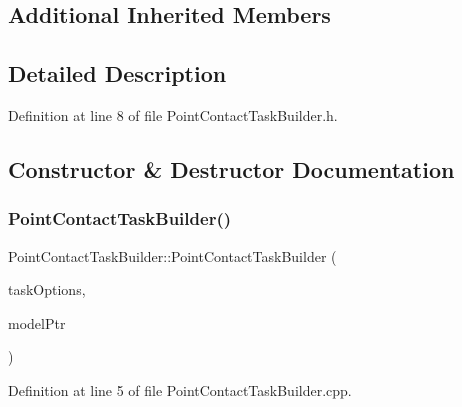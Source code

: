 \subsection*{Additional Inherited Members}


\subsection{Detailed Description}


Definition at line 8 of file Point\+Contact\+Task\+Builder.\+h.



\subsection{Constructor \& Destructor Documentation}
\hypertarget{classocra_1_1PointContactTaskBuilder_a36712065646f637a772e84443ea6bb44}{}\label{classocra_1_1PointContactTaskBuilder_a36712065646f637a772e84443ea6bb44} 
\subsubsection{\texorpdfstring{Point\+Contact\+Task\+Builder()}{PointContactTaskBuilder()}}
{\footnotesize\ttfamily Point\+Contact\+Task\+Builder\+::\+Point\+Contact\+Task\+Builder (\begin{DoxyParamCaption}\item[{const \hyperlink{classocra_1_1TaskBuilderOptions}{Task\+Builder\+Options} \&}]{task\+Options,  }\item[{Model\+::\+Ptr}]{model\+Ptr }\end{DoxyParamCaption})}



Definition at line 5 of file Point\+Contact\+Task\+Builder.\+cpp.

\hypertarget{classocra_1_1PointContactTaskBuilder_a33923536a7481e117db39cc4bc7a9d75}{}\label{classocra_1_1PointContactTaskBuilder_a33923536a7481e117db39cc4bc7a9d75} 
